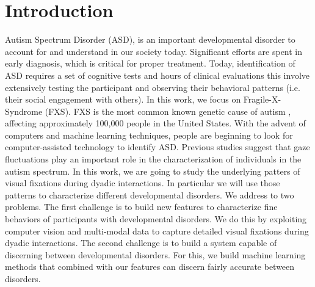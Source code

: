 \documentclass{llncs}
\begin{document}
\section{Introduction}
\vspace{-1em} 
Autism Spectrum Disorder (ASD), is an important developmental disorder to account for and understand in our society today. Significant efforts are spent in early diagnosis, which is critical for proper treatment. Today, identification of ASD requires a set of cognitive tests and hours of clinical evaluations this involve extensively testing the participant and observing their behavioral patterns (i.e. their social engagement with others). In this work, we focus on Fragile-X-Syndrome (FXS). FXS is the most common known genetic cause of autism \cite{Hagerman:2008wg}, affecting approximately 100,000 people in the United States. With the advent of computers and machine learning techniques, people are beginning to look for computer-assisted technology to identify ASD. Previous studies \cite{klin2002} suggest that gaze fluctuations play an important role in the characterization of individuals in the autism spectrum. In this work, we are going to study the underlying patters of visual fixations during dyadic interactions. In particular we will use those patterns to characterize different developmental disorders. We address to two problems. The first challenge is to build new features to characterize fine behaviors of participants with developmental disorders. We do this by exploiting computer vision and multi-modal data to capture detailed visual fixations during dyadic interactions. The second challenge is to build a system capable of discerning between developmental disorders. For this, we build machine learning methods that combined with our features can discern fairly accurate between disorders. 
\end{document}

